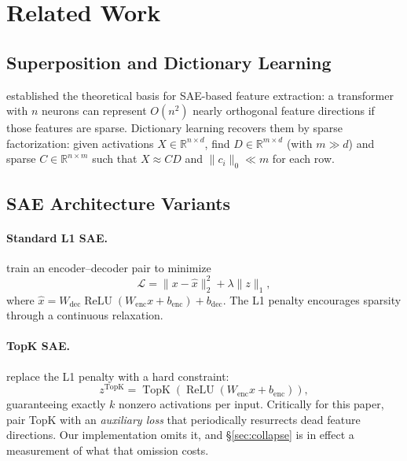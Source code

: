 \documentclass[11pt]{article}
\begin{document}
\section{Related Work}
\label{sec:related}

\subsection{Superposition and Dictionary Learning}

\citet{elhage2022superposition} established the theoretical basis for SAE-based feature
extraction: a transformer with $n$ neurons can represent $O(n^2)$ nearly orthogonal
feature directions if those features are sparse. Dictionary learning recovers them by
sparse factorization: given activations $X \in \mathbb{R}^{n \times d}$, find
$D \in \mathbb{R}^{m \times d}$ (with $m \gg d$) and sparse $C \in \mathbb{R}^{n \times m}$
such that $X \approx CD$ and $\|c_i\|_0 \ll m$ for each row.

\subsection{SAE Architecture Variants}

\paragraph{Standard L1 SAE.}
\citet{cunningham2023sparse,bricken2023monosemanticity} train an encoder--decoder pair
to minimize
\begin{equation}
  \mathcal{L} = \|x - \hat{x}\|_2^2 + \lambda \|z\|_1 ,
  \label{eq:l1}
\end{equation}
where $\hat{x} = W_{\text{dec}} \operatorname{ReLU}(W_{\text{enc}} x + b_{\text{enc}})
+ b_{\text{dec}}$. The L1 penalty encourages sparsity through a continuous relaxation.

\paragraph{TopK SAE.}
\citet{gao2024scaling} replace the L1 penalty with a hard constraint:
\begin{equation}
  z^{\text{TopK}} = \operatorname{TopK}(\operatorname{ReLU}(W_{\text{enc}} x
    + b_{\text{enc}})) ,
  \label{eq:topk}
\end{equation}
guaranteeing exactly $k$ nonzero activations per input. Critically for this paper,
\citet{gao2024scaling} pair TopK with an \emph{auxiliary loss} that periodically
resurrects dead feature directions. Our implementation omits it, and
\S\ref{sec:collapse} is in effect a measurement of what that omission costs.
\end{document}
